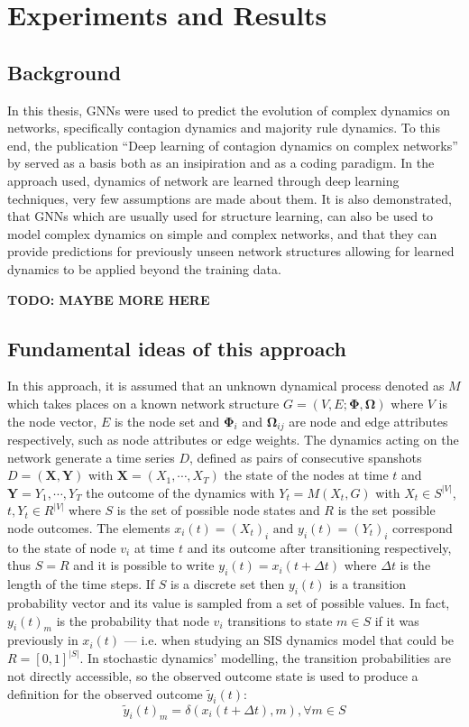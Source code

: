 \chapter{Experiments and Results} \label{experiments}

\section{Background}

In this thesis, GNNs were used to predict the evolution of
complex dynamics on networks, specifically contagion dynamics
and majority rule dynamics. To this end, the publication
``Deep learning of contagion dynamics on complex networks''
by \citet{murphy} served as a basis both as an insipiration
and as a coding paradigm. In the approach used, dynamics of network
are learned through deep learning techniques, very few assumptions
are made about them. It is also demonstrated, that GNNs which
are usually used for structure learning, can also be used to model
complex dynamics on simple and complex networks, and that they
can provide predictions for previously unseen network structures allowing
for learned dynamics to be applied beyond the training data. 

\textbf{TODO: MAYBE MORE HERE}

\section{Fundamental ideas of this approach}

In this approach, it is assumed that an unknown dynamical process
denoted as $M$ which takes places on a known network structure
$G = (V, E; \bm{\Phi}, \bm{\Omega})$ where $V$ is the node vector,
$E$ is the node set and $\bm{\Phi}_i$ and $\bm{\Omega}_{ij}$ are node
and edge attributes respectively, such as node attributes or edge weights. 
The dynamics acting on the network generate a time series $D$, defined as
pairs of consecutive spanshots $D = (\bm{X}, \bm{Y})$ with
$\bm{X} = (X_1, \cdots, X_T)$ the state of the nodes at time $t$ and
$\bm{Y} = {Y_1, \cdots, Y_T}$ the outcome of the dynamics with
$Y_t = M(X_t, G)$ with $X_t \in S^{|V|}$, $t, Y_t \in R^{|V|}$ where
$S$ is the set of possible node states and $R$ is the set possible node
outcomes. The elements $x_i(t) = (X_t)_i \text{ and } y_i(t) = (Y_t)_i$
correspond to the state of node $v_i$ at time $t$ and its outcome after
transitioning respectively, thus $S=R$ and it is possible to write
$y_i(t) = x_i(t + \Delta t)$ where $\Delta t$ is the length of the
time steps. If $S$ is a discrete set then $y_i(t)$ is a transition
probability vector and its value is sampled from a set of possible
values. In fact, $y_i(t)_m$ is the probability that node $v_i$ transitions
to state $m \in S$ if it was previously in $x_i(t)$ --- i.e. when studying
an SIS dynamics model that could be $R = [0,1]^{|S|}$. In stochastic dynamics'
modelling, the transition probabilities are not directly accessible, so
the observed outcome state is used to produce a definition for the observed
outcome $\tilde{y}_i(t)$:
\begin{equation}
  \tilde{y}_i(t)_m = \delta (x_i(t+\Delta t), m), \forall m \in S
\end{equation}

